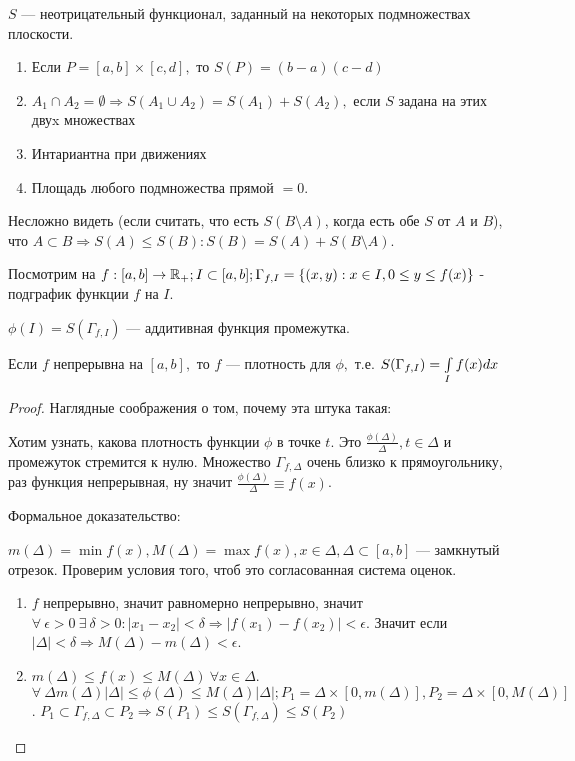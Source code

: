 \documentclass[12pt]{report}
\begin{document}
\begin{ex}

$S$ --- неотрицательный функционал, заданный на некоторых подмножествах плоскости. 
\begin{enumerate}
\item Если $P = [a, b] \times [c, d],$ то $S(P) = (b - a)(c - d)$
\item $A_1 \cap A_2 = \emptyset \Rightarrow S(A_1 \cup A_2) = S(A_1) + S(A_2),$ если $S$ задана на этих двуx множествах
\item Интариантна при движениях
\item Площадь любого подмножества прямой $= 0$.
\end{enumerate}

Несложно видеть (если считать, что есть $S(B\setminus A)$, когда есть обе $S$ от $A$ и $B$), что $A \subset B \Rightarrow S(A) \le S(B): S(B) = S(A) + S(B \setminus A)$.

Посмотрим на $f: [a, b] \to \mathbb{R}_{+}; I \subset [a, b]; \Gamma_{f, I} = \{(x, y): x \in I, 0 \le y \le f(x)\}$ - подграфик функции $f$ на $I$.

$\phi(I) = S(\Gamma_{f, I})$ --- аддитивная функция промежутка.

\begin{thm}
Если $f$ непрерывна на $[a, b],$ то $f$ --- плотность для $\phi,$ т.е. $S(\Gamma_{f, I}) = \int\limits_I{f(x)dx}$
\end{thm}
\begin{proof}
Наглядные соображения о том, почему эта штука такая:

Хотим узнать, какова плотность функции $\phi$ в точке $t$. Это $\frac{\phi(\Delta)}{\Delta}, t \in \Delta$ и промежуток стремится к нулю. Множество $\Gamma_{f, \Delta}$ очень близко к прямоугольнику, раз функция непрерывная, ну значит $\frac{\phi(\Delta)}{\Delta} \equiv f(x)$.

Формальное доказательство:

$m(\Delta) = \min{f(x)}, M(\Delta) = \max{f(x)}, x \in \Delta, \Delta \subset [a, b]$ --- замкнутый отрезок.
Проверим условия того, чтоб это согласованная система оценок.
\begin{enumerate}
\item $f$ непрерывно, значит равномерно непрерывно, значит $\forall ~\epsilon > 0 ~\exists ~\delta > 0: |x_1 - x_2| < \delta \Rightarrow |f(x_1) - f(x_2)| < \epsilon$. Значит если $|\Delta| < \delta \Rightarrow M(\Delta) - m(\Delta) < \epsilon$.
\item $m(\Delta) \le f(x) \le M(\Delta) ~\forall x \in \Delta$. $\forall ~\Delta m(\Delta)|\Delta| \le \phi(\Delta) \le M(\Delta)|\Delta|; P_1 = \Delta \times [0, m(\Delta)], P_2 = \Delta \times [0, M(\Delta)]$. $P_1 \subset \Gamma_{f, \Delta} \subset P_2 \Rightarrow S(P_1) \le S(\Gamma_{f, \Delta}) \le S(P_2)$
\end{enumerate}
\end{proof}
\end{ex}
\end{document}

